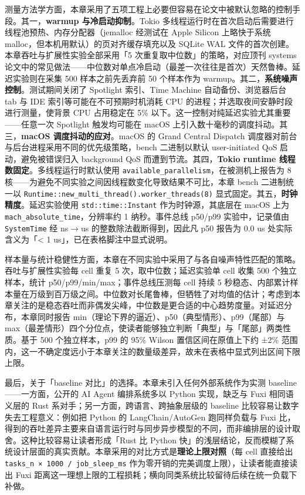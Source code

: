 测量方法学方面，本章采用了五项工程上必要但容易在论文中被默认忽略的控制手段。其一，\textbf{warmup 与冷启动抑制}。Tokio 多线程运行时在首次启动后需要进行线程池预热、内存分配器（jemalloc 经测试在 Apple Silicon 上略快于系统 malloc，但本机用默认）的页对齐缓存填充以及 SQLite WAL 文件的首次创建。本章吞吐与扩展性实验全部采用「5 次重复取中位数」的策略，对应顶刊 systems 论文中的常见做法——中位数对单点冷启动（最差一次往往是首次）天然鲁棒。延迟实验则在采集 500 样本之前先丢弃前 50 个样本作为 warmup。其二，\textbf{系统噪声控制}。测试期间关闭了 Spotlight 索引、Time Machine 自动备份、浏览器后台 tab 与 IDE 索引等可能在不可预期时机消耗 CPU 的进程；并选取夜间安静时段进行测量，使背景 CPU 占用稳定在 5\% 以下。这一控制对纯延迟实验尤其重要——任意一次 Spotlight 触发均可能在 macOS 上引入数十毫秒的调度抖动。其三，\textbf{macOS 调度抖动的应对}。macOS 的 Grand Central Dispatch 调度器对前台与后台进程采用不同的优先级策略，bench 二进制以默认 user-initiated QoS 启动，避免被错误归入 background QoS 而遭到节流。其四，\textbf{Tokio runtime 线程数固定}。多线程运行时默认使用 \texttt{available\_parallelism}，在被测机上报告为 8 核——为避免不同实验之间因线程数变化导致结果不可比，本章 bench 二进制统一以 \texttt{Runtime::new\_multi\_thread().worker\_threads(8)} 显式固定。其五，\textbf{时钟精度}。延迟实验使用 \texttt{std::time::Instant} 作为时钟源，其底层在 macOS 上为 \texttt{mach\_absolute\_time}，分辨率约 1 纳秒。事件总线 p50/p99 实验中，记录值由 \texttt{SystemTime} 经 ns$\to$us 的整数除法截断得到，因此凡 p50 报告为 0.0 us 处实际含义为「< 1 us」，已在表格脚注中显式说明。

样本量与统计稳健性方面，本章在不同实验中采用了与各自噪声特性匹配的策略。吞吐与扩展性实验每 cell 重复 5 次，取中位数；延迟实验单 cell 收集 500 个独立样本，统计 p50/p99/min/max；事件总线压测每 cell 持续 5 秒稳态、内部累计样本量在万级到百万级之间。中位数对长尾鲁棒，但牺牲了对均值的估计；考虑到本章关注的是稳态吞吐而非偶发尖峰，中位数是更合适的中心趋势度量。对延迟分布，本章同时报告 min（理论下界的逼近）、p50（典型情形）、p99（尾部）与 max（最差情形）四个分位点，使读者能够独立判断「典型」与「尾部」两类性质。基于 500 个独立样本，p99 的 95\% Wilson 置信区间在原值上下约 ±2\% 范围内，这一不确定度远小于本章关注的数量级差异，故未在表格中显式列出区间下限上限。

最后，关于「baseline 对比」的选择。本章未引入任何外部系统作为实测 baseline——一方面，公开的 AI Agent 编排系统多以 Python 实现，缺乏与 Fuxi 相同语义层的 Rust 系对手；另一方面，跨语言、跨抽象层级的 baseline 比较容易让数字失去工程意义：例如把 Python 的 LangChain/AutoGen 跑同样负载与 Fuxi 比，得到的吞吐差异主要来自语言运行时与同步异步模型的不同，而非编排层的设计取舍。这种比较容易让读者形成「Rust 比 Python 快」的浅层结论，反而模糊了系统设计层面的真实贡献。本章采用的对比方式是\textbf{理论上限对照}（每 cell 直接给出 \texttt{tasks\_n × 1000 / job\_sleep\_ms} 作为零开销的完美调度上限），让读者能直接读出 Fuxi 距离这一理想上限的工程损耗；横向同类系统比较留待后续在统一负载下补做。

